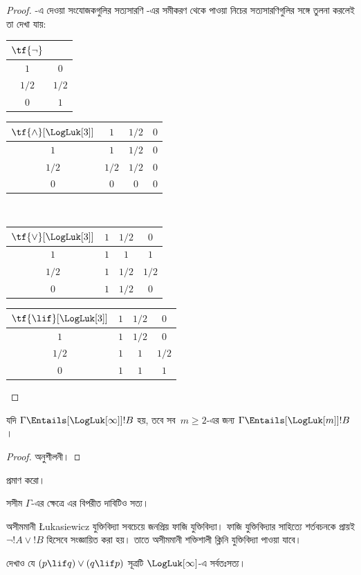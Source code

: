 \documentclass[../../../include/open-logic-section]{subfiles}
\begin{document}
\begin{proof}
  -এ দেওয়া সংযোজকগুলির সত্যসারণি
  -এর সমীকরণ থেকে পাওয়া নিচের সত্যসারণিগুলির
  সঙ্গে তুলনা করলেই তা দেখা যায়:
  \begin{center}
    \begin{tabular}{c|c}
      $\tf{\lnot}$ & \\
      \hline
      $1$ & $0$ \\
      $1/2$ & $1/2$ \\
      $0$ & $1$
    \end{tabular}
    \quad
    \begin{tabular}{c|ccc}
      $\tf{\land}[\LogLuk[3]]$ & $1$ & $1/2$ & $0$ \\
      \hline
      $1$ & $1$ & $1/2$ & $0$ \\
      $1/2$ & $1/2$ & $1/2$ & $0$\\
      $0$ & $0$ & $0$ & $0$
    \end{tabular}
    \\[2ex]
    \begin{tabular}{c|ccc}
      $\tf{\lor}[\LogLuk[3]]$ & $1$ & $1/2$ & $0$ \\
      \hline
      $1$ & $1$ & $1$ & $1$ \\
      $1/2$ & $1$ & $1/2$ & $1/2$ \\
      $0$ & $1$ & $1/2$ & $0$
    \end{tabular}
    \quad
    \begin{tabular}{c|ccc}
      $\tf{\lif}[\LogLuk[3]]$ & $1$ & $1/2$ & $0$ \\
      \hline
      $1$ & $1$ & $1/2$ & $0$ \\
      $1/2$ & $1$ & $1$ & $1/2$ \\
      $0$ & $1$ & $1$ & $1$
    \end{tabular}
  \end{center}
\end{proof}

\begin{prop}
  যদি $\Gamma \Entails[\LogLuk[\infty]] !B$ হয়, তবে সব~$m \ge 2$-এর
  জন্য $\Gamma \Entails[\LogLuk[m]] !B$।
\end{prop}

\begin{proof}
  অনুশীলনী।
\end{proof}

\begin{prob}
   প্রমাণ করো।
\end{prob}

সসীম $\Gamma$-এর ক্ষেত্রে এর বিপরীত দাবিটিও সত্য।

অসীমমানী \L ukasiewicz যুক্তিবিদ্যা সবচেয়ে জনপ্রিয় ফাজি যুক্তিবিদ্যা।
ফাজি যুক্তিবিদ্যার সাহিত্যে শর্তবচনকে প্রায়ই $\lnot !A \lor !B$
হিসেবে সংজ্ঞায়িত করা হয়। তাতে অসীমমানী শক্তিশালী ক্লিনি যুক্তিবিদ্যা
পাওয়া যাবে।

\begin{prob}
  দেখাও যে $(p \lif q) \lor (q \lif p)$ সূত্রটি
  $\LogLuk[\infty]$-এ সর্বতঃসত্য।
\end{prob}
\end{document}
